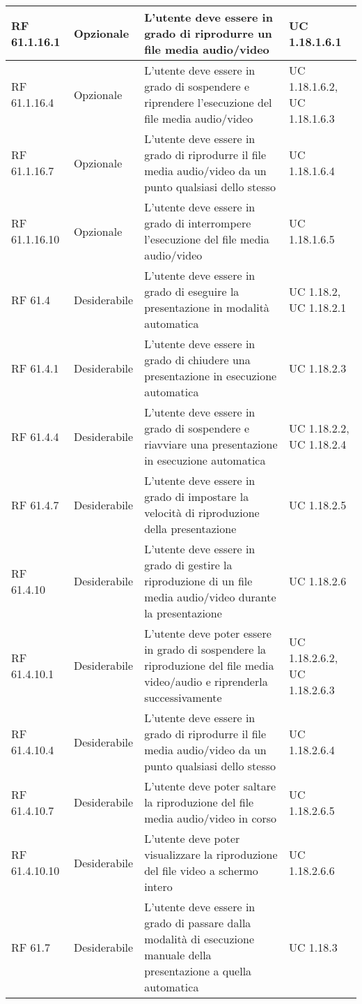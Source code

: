{\begin{longtable} [c]{| p{2.5cm} | p{2.5cm} | p{6cm} |p{2.5cm}|}
 \hline 
RF 61.1.16.1 & Opzionale & L'utente deve essere in grado di riprodurre un file media audio/video & UC 1.18.1.6.1\\ 
 \hline 
RF 61.1.16.4 & Opzionale & L'utente deve essere in grado di sospendere e riprendere l'esecuzione del file media audio/video & UC 1.18.1.6.2, UC 1.18.1.6.3\\ 
 \hline 
RF 61.1.16.7 & Opzionale & L'utente deve essere in grado di riprodurre il file media audio/video da un punto qualsiasi dello stesso & UC 1.18.1.6.4\\ 
 \hline 
RF 61.1.16.10 & Opzionale & L'utente deve essere in grado di  interrompere l'esecuzione del file media audio/video & UC 1.18.1.6.5\\ 
 \hline 
RF 61.4 & Desiderabile & L'utente deve essere in grado di eseguire la presentazione in modalità automatica & UC 1.18.2, UC 1.18.2.1\\ 
 \hline 
RF 61.4.1 & Desiderabile & L'utente deve essere in grado di chiudere una presentazione in esecuzione automatica & UC 1.18.2.3\\ 
 \hline 
RF 61.4.4 & Desiderabile & L'utente deve essere in grado di sospendere e riavviare una presentazione in esecuzione automatica & UC 1.18.2.2, UC 1.18.2.4\\ 
 \hline 
RF 61.4.7 & Desiderabile & L'utente deve essere in grado di impostare la velocità di riproduzione della presentazione & UC 1.18.2.5\\ 
 \hline 
RF 61.4.10 & Desiderabile & L'utente deve essere in grado di gestire la riproduzione di un file media audio/video durante la presentazione & UC 1.18.2.6\\ 
 \hline 
RF 61.4.10.1 & Desiderabile & L'utente deve poter essere in grado di sospendere la riproduzione del file media video/audio e riprenderla successivamente & UC 1.18.2.6.2, UC 1.18.2.6.3\\ 
 \hline 
RF 61.4.10.4 & Desiderabile & L'utente deve essere in grado di riprodurre il file media audio/video da un punto qualsiasi dello stesso & UC 1.18.2.6.4\\ 
 \hline 
RF 61.4.10.7 & Desiderabile & L'utente deve poter saltare la riproduzione del file media audio/video in corso & UC 1.18.2.6.5\\ 
 \hline 
RF 61.4.10.10 & Desiderabile & L'utente deve poter visualizzare la riproduzione del file video a schermo intero & UC 1.18.2.6.6\\ 
 \hline 
RF 61.7 & Desiderabile & L'utente deve essere in grado di passare dalla modalità di esecuzione manuale della presentazione a quella automatica & UC 1.18.3\\ 

\end{longtable}}
